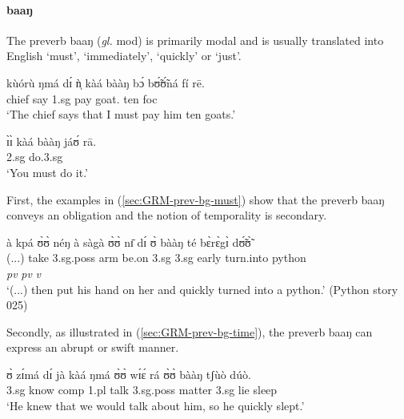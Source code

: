 \begin{exe}
\begin{exe}
\begin{exe}
{\begin{exe}
\begin{exe}
\begin{exe}
\begin{exe}
\begin{exe}
\begin{exe}
\begin{exe}
\begin{exe}
\begin{exe}
\begin{exe}
\begin{exe}
\begin{exe}
\begin{exe}
\begin{exe}
\begin{exe}
\begin{exe}
\begin{exe}
\begin{exe}
\begin{exe}
\begin{exe}
\paragraph{baaŋ}
\label{sec:GRM-preverb-baang}

 The preverb  {\sls baaŋ}  ({\it gl.} {\sc mod})  is primarily modal and is  
usually translated into English `must', `immediately', `quickly'  or `just'. 


\ea\label{sec:GRM-prev-bg-must}
\ea\label{ex:GRM-7.17}
\gll  kùórù ŋmá dɪ́ ǹ̩ kàá bààŋ bɔ́ bʊ̃́ʊ̃́ná  fí rē.\\
 chief say {\comp} {\sc 1.sg} {\fut} {\mod}   pay  goat.{\pl} ten {\sc foc}\\
\glt  `The chief says that I must pay him ten goats.' 

\ex\label{ex:GRM-14.3}
\gll  ɪ̀ɪ̀ kàá bààŋ jáʊ́ rā.\\
{\sc 2.sg} {\fut} {\mod} do.{\sc 3.sg} {\foc}\\
\glt  `You must do it.'

 \z 
 \z
 
 First, the examples in (\ref{sec:GRM-prev-bg-must}) show that  the preverb  
{\sls baaŋ} conveys an obligation and the notion of temporality is secondary. 


\ea\label{sec:GRM-prev-bg-time}
 à kpá ʊ̀ʊ̀ néŋ à sàgà ʊ̀ʊ̀ nɪ̄ dɪ́ ʊ̀ bààŋ té 
bɛ̀rɛ̀gɪ̀ dʊ̃́ʊ̃̀\\
  {(...})  {\conn}  take {\sc 3.sg.poss} arm {\conn} {be.on} {\sc
3.sg}  {\postp} {\conn} {\sc 3.sg} {\mod} {early} turn.into python\\
{} {} {} {} {} {} {} {} {} {} {} {\it pv} {\it pv} {\it v} {}\\

\glt  `(...) then put his hand on her  and quickly turned into
a python.' (Python story 025)
\z
   
   Secondly, as illustrated in (\ref{sec:GRM-prev-bg-time}),  the preverb  
{\sls baaŋ} can express an  abrupt or
swift   manner. 




 \ea\label{ex:GRM-prev-bg-excerpt}
\ea\label{ex:FUS-mod}
\gll  ʊ̀ zɪ́má dɪ́ jà kàá ŋmá ʊ̀ʊ̀ wɪ́ɛ́ rá ʊ̀ʊ̀ bààŋ tʃùò dúò.\\
 {\sc 3.sg}  know {\sc comp}  {\sc 1.pl}  {\fut} talk   {\sc 3.sg.poss} matter 
{\foc} {\sc 3.sg} {\mod} lie sleep\\
\glt  `He knew that we would talk about him, so he quickly slept.'


\end{exe}
\end{exe}
\end{exe}
\end{exe}
\end{exe}
\end{exe}
\end{exe}
\end{exe}
\end{exe}
\end{exe}
\end{exe}
\end{exe}
\end{exe}
\end{exe}
\end{exe}
\end{exe}
\end{exe}
\end{exe}
\end{exe}
\end{exe}}
\end{exe}
\end{exe}
\end{exe}
